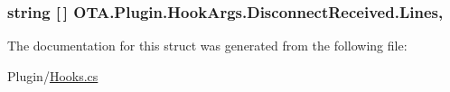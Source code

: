 \subsubsection[{Lines}]{\setlength{\rightskip}{0pt plus 5cm}string \mbox{[}$\,$\mbox{]} O\+T\+A.\+Plugin.\+Hook\+Args.\+Disconnect\+Received.\+Lines\hspace{0.3cm}{\ttfamily [get]}, {\ttfamily [set]}}\label{struct_o_t_a_1_1_plugin_1_1_hook_args_1_1_disconnect_received_ae4c80f6844358b2cf6d2a5562c3ebd55}


The documentation for this struct was generated from the following file\+:\begin{DoxyCompactItemize}
\item 
Plugin/\hyperlink{_hooks_8cs}{Hooks.\+cs}\end{DoxyCompactItemize}
